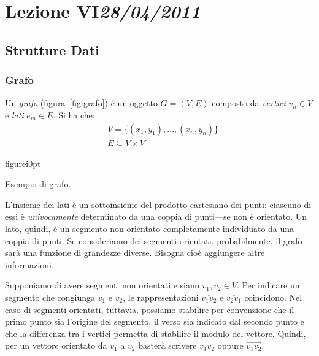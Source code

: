 \chapter[Lezione VI]{Lezione VI\newline\small{\emph{28/04/2011}}}
	\section{Strutture Dati}
		\subsection{Grafo}
		\label{subsec:grafo}
Un \emph{grafo} (figura~\ref{fig:grafo}) è un oggetto $G = (V, E)$ composto da \emph{vertici} $v_n\in V$ e \emph{lati} $e_m\in E$. Si ha che:
\[
\begin{split}
&V=\{(x_1,y_1),\dots,(x_n,y_n)\} \\
&E\subseteq V\times V
\end{split}
\]
\begin{wrapfloat}{figure}{i}{0pt}{
}
	\caption{Esempio di grafo.}
	\label{fig:grafo}
\end{wrapfloat}
L'insieme dei lati è un sottoinsieme del prodotto cartesiano dei punti: ciascuno di essi è \emph{univocamente} determinato da una coppia di punti---se non è orientato.
Un lato, quindi, è un segmento non orientato completamente individuato da una coppia di punti.
Se consideriamo dei segmenti orientati, probabilmente, il grafo sarà una funzione di grandezze diverse.
Bisogna cioè aggiungere altre informazioni.

Supponiamo di avere segmenti non orientati e siano $v_1,v_2\in V$.
Per indicare un segmento che congiunga $v_1$ e $v_2$, le rappresentazioni $\overline{v_{1}v_{2}}$ e $\overline{v_{2}v_{1}}$ coincidono.
Nel caso di segmenti orientati, tuttavia, possiamo stabilire per convenzione che il primo punto sia l'origine del segmento, il verso sia indicato dal secondo punto e che la differenza tra i vertici permetta di stabilire il modulo del vettore.
Quindi, per un vettore orientato da $v_1$ a $v_2$ basterà scrivere $\overline{v_{1}v_{2}}$ oppure $\overrightarrow{v_{1}v_{2}}$.


